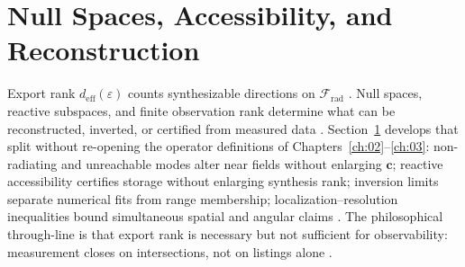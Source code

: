 \section{Null Spaces, Accessibility, and Reconstruction}
\label{sec:ch47}

Export rank \(d_{\mathrm{eff}}(\varepsilon)\) counts synthesizable directions on \(\mathcal{F}_{\mathrm{rad}}\) \cite{stratton1941,harrington2001,hansen1988}.
Null spaces, reactive subspaces, and finite observation rank determine what can be reconstructed, inverted, or certified from measured data
\cite{devaney2004}. Section~\ref{sec:ch47} develops that split without re-opening the operator definitions of Chapters~\ref{ch:02}--\ref{ch:03}:
non-radiating and unreachable modes alter near fields without enlarging \(\mathbf{c}\); reactive accessibility certifies storage without
enlarging synthesis rank; inversion limits separate numerical fits from range membership; localization--resolution inequalities bound simultaneous
spatial and angular claims \cite{stratton1941,harrington2001,jackson1999,hansen1988}. The philosophical through-line is that export rank is
necessary but not sufficient for observability: measurement closes on intersections, not on listings alone \cite{devaney2004}.

